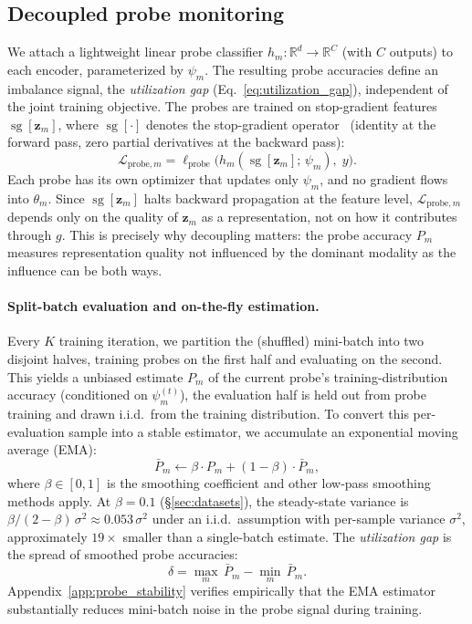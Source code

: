\documentclass{article}
\newcommand{\loss}{\mathcal{L}}
\newcommand{\probe}{h}
\newcommand{\sg}{\operatorname{sg}}
\begin{document}
\FloatBarrier
\subsection{Decoupled probe monitoring}
\label{sec:probes}

We attach a lightweight linear probe classifier $\probe_m\colon \mathbb{R}^d \to \mathbb{R}^C$ (with $C$ outputs) to each encoder, parameterized by $\psi_m$. The resulting probe accuracies define an imbalance signal, the \emph{utilization gap} (Eq.~\ref{eq:utilization_gap}), independent of the joint training objective. The probes are trained on stop-gradient features $\sg[\mathbf{z}_m]$, where $\sg[\cdot]$ denotes the stop-gradient operator~\citep{vandenoord2017vqvae} (identity at the forward pass, zero partial derivatives at the backward pass):
%
\begin{equation}
\label{eq:probe_loss}
\loss_{\text{probe},m} = \ell_{\text{probe}}\!\bigl(\probe_m(\sg[\mathbf{z}_m];\,\psi_m),\; y\bigr).
\end{equation}
%
Each probe has its own optimizer that updates only $\psi_m$, and no gradient flows into $\theta_m$. Since $\sg[\mathbf{z}_m]$ halts backward propagation at the feature level, $\loss_{\text{probe},m}$ depends only on the quality of $\mathbf{z}_m$ as a representation, not on how it contributes through $g$. This is precisely why decoupling matters: the probe accuracy $P_m$ measures representation quality not influenced by the dominant modality as the influence can be both ways.

\paragraph{Split-batch evaluation and on-the-fly estimation.}
Every $K$ training iteration, we partition the (shuffled) mini-batch into two disjoint halves, training probes on the first half and evaluating on the second. This yields a unbiased estimate $P_m$ of the current probe's training-distribution accuracy (conditioned on $\psi_m^{(t)}$), the evaluation half is held out from probe training and drawn i.i.d.\ from the training distribution. To convert this per-evaluation sample into a stable estimator, we accumulate an exponential moving average (EMA):
%
\begin{equation}
\label{eq:ema_probe}
\bar{P}_m \leftarrow \beta \cdot P_m + (1 - \beta) \cdot \bar{P}_m,
\end{equation}
%
where $\beta \in [0,1]$ is the smoothing coefficient and other low-pass smoothing methods apply. At $\beta = 0.1$ (\S\ref{sec:datasets}), the steady-state variance is $\beta/(2-\beta)\,\sigma^{2} \approx 0.053\,\sigma^{2}$ under an i.i.d.\ assumption with per-sample variance $\sigma^{2}$, approximately $19\times$ smaller than a single-batch estimate. The \emph{utilization gap} is the spread of smoothed probe accuracies:
%
\begin{equation}
\label{eq:utilization_gap}
\delta = \max_{m}\,\bar{P}_m - \min_{m}\,\bar{P}_m.
\end{equation}
%
Appendix~\ref{app:probe_stability} verifies empirically that the EMA estimator substantially reduces mini-batch noise in the probe signal during training.
\end{document}
